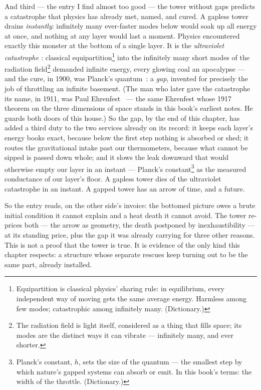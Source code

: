 \documentclass[fontsize=11pt,paper=a4,pagesize=auto,parskip=half-]{scrbook}
\newcommand{\Ixtmp}{}
\DeclareRobustCommand{\Ix}[1]{%
  #1%
  \begingroup
    \lowercase{\gdef\Ixtmp{#1}}%
    \expandafter\index\expandafter{\Ixtmp}%
  \endgroup}
\newcommand{\Iy}[1]{#1\index{#1}}
\begin{document}
And third --- the entry I find almost too good --- the tower without gaps predicts a catastrophe that physics has already met, named, and cured. A gapless tower drains \emph{instantly}: infinitely many ever-faster modes below would soak up all energy at once, and nothing at any layer would last a moment. Physics encountered exactly this monster at the bottom of a single layer. It is the \emph{\Ix{ultraviolet catastrophe}}: classical equipartition\footnote{Equipartition is classical physics' sharing rule: in equilibrium, every independent way of moving gets the same average energy. Harmless among few modes; catastrophic among infinitely many. (Dictionary.)} into the infinitely many short modes of the radiation field\footnote{The radiation field is light itself, considered as a thing that fills space; its modes are the distinct ways it can vibrate --- infinitely many, and ever shorter.} demanded infinite energy, every glowing coal an apocalypse --- and the cure, in 1900, was \Iy{Planck}'s quantum~\cite{planck1900}: a \emph{gap}, invented for precisely the job of throttling an infinite basement. (The man who later gave the catastrophe its name, in 1911, was Paul \Iy{Ehrenfest}~\cite{ehrenfest1911} --- the same Ehrenfest whose 1917 theorem on the three dimensions of space stands in this book's earliest notes. He guards both doors of this house.) So the gap, by the end of this chapter, has added a third duty to the two services already on its record: it keeps each layer's energy books exact, because below the first step nothing is absorbed or shed; it routes the gravitational intake past our thermometers, because what cannot be sipped is passed down whole; and it slows the leak downward that would otherwise empty our layer in an instant --- Planck's constant\footnote{Planck's constant, $h$, sets the size of the quantum --- the smallest step by which nature's gapped systems can absorb or emit. In this book's terms: the width of the throttle. (Dictionary.)} as the measured conductance of our layer's floor. A gapless tower dies of the ultraviolet catastrophe in an instant. A gapped tower has an arrow of time, and a future.

So the entry reads, on the other side's invoice: the bottomed picture owes a brute initial condition it cannot explain and a heat death it cannot avoid. The tower re-prices both --- the arrow as geometry, the death postponed by inexhaustibility --- at its standing price, plus the gap it was already carrying for three other reasons. This is not a proof that the tower is true. It is evidence of the only kind this chapter respects: a structure whose separate rescues keep turning out to be the same part, already installed.
\end{document}
